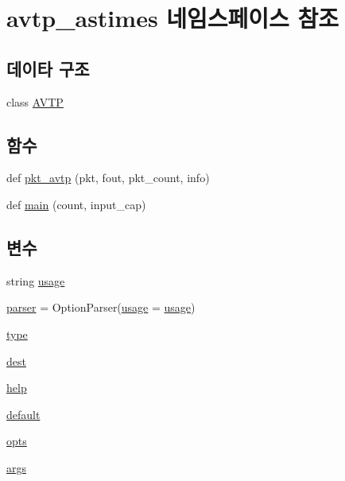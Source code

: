 \hypertarget{namespaceavtp__astimes}{}\section{avtp\+\_\+astimes 네임스페이스 참조}
\label{namespaceavtp__astimes}
\subsection*{데이타 구조}
\begin{DoxyCompactItemize}
\item 
class \hyperlink{classavtp__astimes_1_1_a_v_t_p}{A\+V\+TP}
\end{DoxyCompactItemize}
\subsection*{함수}
\begin{DoxyCompactItemize}
\item 
def \hyperlink{namespaceavtp__astimes_a71c89e27ea4d1ec1581b04e71cdb6ae2}{pkt\+\_\+avtp} (pkt, fout, pkt\+\_\+count, info)
\item 
def \hyperlink{namespaceavtp__astimes_a8ee95d891b3aa8e8887bc86fb3ccd3f4}{main} (count, input\+\_\+cap)
\end{DoxyCompactItemize}
\subsection*{변수}
\begin{DoxyCompactItemize}
\item 
string \hyperlink{namespaceavtp__astimes_a61e5f066c879e5430d8f713c2c3a8b31}{usage}
\item 
\hyperlink{namespaceavtp__astimes_a90eee7a4677ca8b1ed116364a24367f9}{parser} = Option\+Parser(\hyperlink{namespaceavtp__astimes_a61e5f066c879e5430d8f713c2c3a8b31}{usage} = \hyperlink{namespaceavtp__astimes_a61e5f066c879e5430d8f713c2c3a8b31}{usage})
\item 
\hyperlink{namespaceavtp__astimes_a7aead736a07eaf25623ad7bfa1f0ee2d}{type}
\item 
\hyperlink{namespaceavtp__astimes_ab0bede79c5f4cbed9c2cd932a0ace201}{dest}
\item 
\hyperlink{namespaceavtp__astimes_a81ae9faedaa69e3e28e2960a0548df8d}{help}
\item 
\hyperlink{namespaceavtp__astimes_affb1327b18bf08a379d19eef89cf1ed1}{default}
\item 
\hyperlink{namespaceavtp__astimes_aa17b9f50d41f0a8e95659986136435dd}{opts}
\item 
\hyperlink{namespaceavtp__astimes_a8187411843a6284ffb964ef3fb9fcab3}{args}
\end{DoxyCompactItemize}


